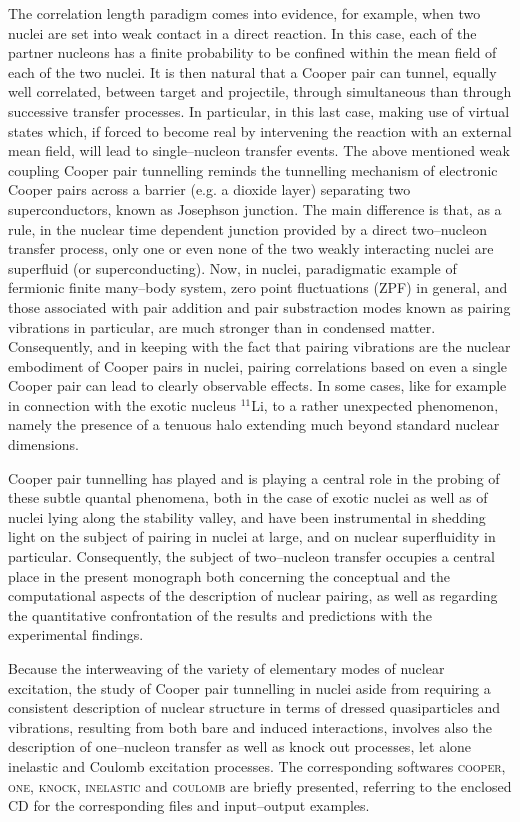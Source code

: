 \documentclass[a4paper,14pt]{book}
\begin{document}
The correlation length paradigm comes into evidence, for example, when two nuclei are set into weak contact in a direct reaction. In this case, each of the partner nucleons has a finite probability to be confined within the mean field of each of the two nuclei. It is then natural that a Cooper pair can tunnel, equally well correlated, between target and projectile, through simultaneous than through successive transfer processes. In particular, in this last case, making use of virtual states which, if forced to become real by intervening the reaction with an external mean field, will lead to single--nucleon transfer events. The above mentioned weak coupling Cooper pair tunnelling reminds  the tunnelling mechanism of electronic Cooper pairs across a barrier (e.g. a dioxide layer) separating two superconductors, known as Josephson junction. The main difference is that, as a rule, in the nuclear time dependent junction provided by a direct two--nucleon transfer process, only one or even none of the two weakly interacting nuclei are superfluid (or superconducting). Now, in nuclei, paradigmatic example of fermionic  finite many--body system, zero point fluctuations  (ZPF) in general, and those associated with pair addition and pair substraction modes known as pairing vibrations in particular, are much stronger than in condensed matter. Consequently, and in keeping with the fact that pairing vibrations are the nuclear embodiment of Cooper pairs in nuclei,   pairing correlations based on even  a single Cooper pair can lead to clearly observable effects. In  some cases, like for example in connection with the exotic nucleus $^{11}$Li, to a rather unexpected phenomenon, namely the presence of a tenuous halo extending much beyond standard nuclear dimensions.


 Cooper pair tunnelling has played and is playing a central role in the probing of these subtle quantal phenomena, both in the case of  exotic nuclei as well as of nuclei lying along the stability valley, and have been instrumental in shedding light on the subject of pairing in nuclei at large, and on nuclear superfluidity in particular. Consequently, the subject of two--nucleon transfer occupies  a central place in the present monograph both concerning the conceptual and the computational aspects of the description of nuclear pairing, as well as regarding the quantitative confrontation of the results and predictions with the experimental findings.

Because the interweaving of the variety of elementary modes of nuclear excitation, the study of Cooper pair tunnelling in nuclei aside from requiring a consistent description of nuclear structure in terms of dressed quasiparticles and vibrations, resulting from both bare and induced interactions, involves also the description of one--nucleon transfer as well as knock out processes, let alone inelastic and Coulomb excitation processes.
The corresponding softwares \textsc{cooper, one, knock, inelastic} and \textsc{coulomb} are briefly presented, referring to the enclosed CD for the corresponding files and input--output examples.
\end{document}
